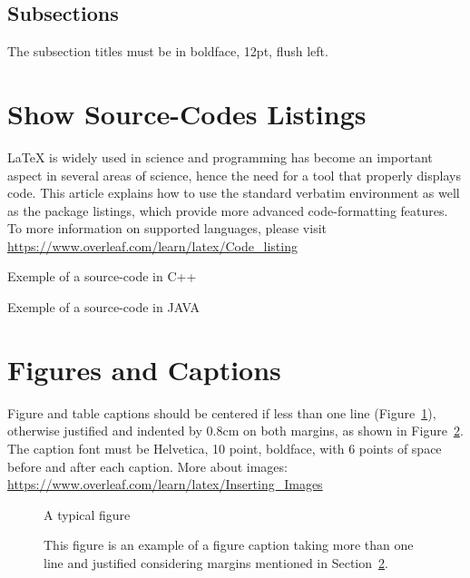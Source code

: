 \documentclass[12pt]{article}
\begin{document}
\subsection{Subsections}

The subsection titles must be in boldface, 12pt, flush left.

\section{Show Source-Codes Listings}

LaTeX is widely used in science and programming has become an important aspect in several areas of science, hence the need for a tool that properly displays code. This article explains how to use the standard verbatim environment as well as the package listings, which provide more advanced code-formatting features. To more information on supported languages, please visit \url{https://www.overleaf.com/learn/latex/Code_listing}

Exemple of a source-code in C++
% 

Exemple of a source-code in JAVA
% 


\section{Figures and Captions}\label{sec:figs}

Figure and table captions should be centered if less than one line
(Figure~\ref{fig:exampleFig1}), otherwise justified and indented by 0.8cm on
both margins, as shown in Figure~\ref{fig:exampleFig2}. The caption font must
be Helvetica, 10 point, boldface, with 6 points of space before and after each
caption. More about images: \url{https://www.overleaf.com/learn/latex/Inserting_Images}

\begin{figure}[ht]
\centering
\caption{A typical figure}
\label{fig:exampleFig1}
\end{figure}

\begin{figure}[ht]
\centering
\caption{This figure is an example of a figure caption taking more than one
  line and justified considering margins mentioned in Section~\ref{sec:figs}.}
\label{fig:exampleFig2}
\end{figure}
\end{document}
